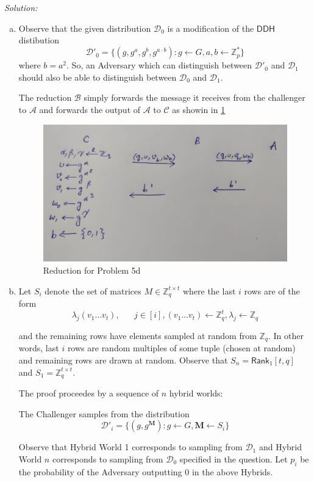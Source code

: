 \documentclass[a4paper, 11pt]{article}
\newenvironment{solution}
    {\textit{Solution:}}
    {\clearpage}
\newcommand{\ddh}{\mathsf{DDH}}
\newcommand{\Z}{\mathbb{Z}}
\newcommand{\calA}{\mathcal{A}}
\newcommand{\calB}{\mathcal{B}}
\newcommand{\calC}{\mathcal{C}}
\newcommand{\calD}{\mathcal{D}}
\begin{document}
\begin{solution}
\begin{enumerate}[(a)]
        \item Observe that the given distribution $\calD_0$ is a modification of the $\ddh$ distibution $$\calD'_0=\{(g, g^a, g^b, g^{a\cdot b}) : g\gets G, a,b\gets\Z^*_p \}$$ where $b=a^2$. So, an Adversary which can distinguish between $\calD'_0$ and $\calD_1$ should also be able to distinguish between $\calD_0$ and $\calD_1$.

              The reduction $\calB$ simply forwards the message it receives from the challenger to $\calA$ and forwards the output of $\calA$ to $\calC$ as showin in \cref{fig:p5d}
              \begin{figure}[!ht]
                  \centering
                  \includegraphics[scale=0.25]{images/Reduction5d.jpg}
                  \caption{Reduction for Problem 5d}
                  \label{fig:p5d}
              \end{figure}

        \item Let $S_i$ denote the set of matrices $M\in\Z_q^{t\times t}$ where the last $i$ rows are of the form
              $$\lambda_j (v_1 \dots v_t),\hspace{20pt} j\in[i], (v_1 \dots v_t)\gets\Z_q^t, \lambda_j\gets\Z_q$$

              and the remaining rows have elements sampled at random from $\Z_q$. In other words, last $i$ rows are random multiples of some tuple (chosen at random) and remaining rows are drawn at random. Observe that $S_n=\mathsf{Rank}_1[t,q]$ and $S_1=\Z_q^{t\times t}$.

              The proof proceedes by a sequence of $n$ hybrid worlds:
              \begin{world}
                  The Challenger samples from the distribution $$\calD'_i=\{(g,g^\mathbf{M}): g\gets G,\mathbf{M}\gets S_i \}$$
              \end{world}
              Observe that Hybrid World 1 corresponds to sampling from $\calD_1$ and Hybrid World $n$ corresponds to sampling from  $\calD_0$ specified in the question.
              Let $p_i$ be the probability of the Adversary outputting 0 in the above Hybrids.


\end{enumerate}
\end{solution}
\end{document}
